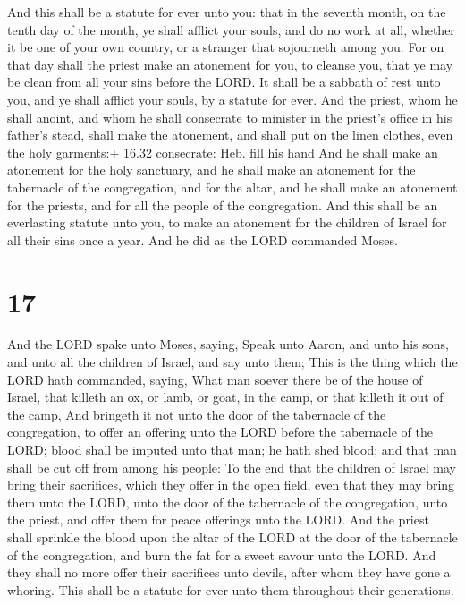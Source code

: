  And this shall be a statute for ever unto you: that in
the seventh month, on the tenth day of the month, ye shall afflict your
souls, and do no work at all, whether it be one of your own country, or
a stranger that sojourneth among you:  For on that day
shall the priest make an atonement for you, to cleanse you, that ye may
be clean from all your sins before the LORD.  It shall be a
sabbath of rest unto you, and ye shall afflict your souls, by a statute
for ever.  And the priest, whom he shall anoint, and whom
he shall consecrate to minister in the priest's office in his father's
stead, shall make the atonement, and shall put on the linen clothes,
even the holy garments:+ 16.32 consecrate: Heb. fill his hand
 And he shall make an atonement for the holy sanctuary, and
he shall make an atonement for the tabernacle of the congregation, and
for the altar, and he shall make an atonement for the priests, and for
all the people of the congregation.  And this shall be an
everlasting statute unto you, to make an atonement for the children of
Israel for all their sins once a year. And he did as the LORD commanded
Moses.

\hypertarget{section-16}{%
\section{17}\label{section-16}}

 And the LORD spake unto Moses, saying,  Speak
unto Aaron, and unto his sons, and unto all the children of Israel, and
say unto them; This is the thing which the LORD hath commanded, saying,
 What man soever there be of the house of Israel, that
killeth an ox, or lamb, or goat, in the camp, or that killeth it out of
the camp,  And bringeth it not unto the door of the
tabernacle of the congregation, to offer an offering unto the LORD
before the tabernacle of the LORD; blood shall be imputed unto that man;
he hath shed blood; and that man shall be cut off from among his people:
 To the end that the children of Israel may bring their
sacrifices, which they offer in the open field, even that they may bring
them unto the LORD, unto the door of the tabernacle of the congregation,
unto the priest, and offer them for peace offerings unto the LORD.
 And the priest shall sprinkle the blood upon the altar of
the LORD at the door of the tabernacle of the congregation, and burn the
fat for a sweet savour unto the LORD.  And they shall no
more offer their sacrifices unto devils, after whom they have gone a
whoring. This shall be a statute for ever unto them throughout their
generations.

